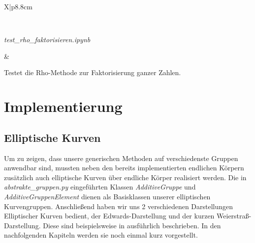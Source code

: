 \documentclass{scrartcl}
\begin{document}
\begin{table}[!ht]
\begin{tabularx}{\linewidth}{X|p{8.8cm}}
\begin{minipage}{\linewidth}
  \end{minipage} \\
  \hline
    \begin{minipage}{\linewidth}
    \emph{test\_rho\_faktorisieren.ipynb}
  \end{minipage} &
  \begin{minipage}{\linewidth}
      \vspace{2pt} Testet die Rho-Methode zur Faktorisierung ganzer Zahlen.   \vspace{2pt}
  \end{minipage}
\end{tabularx}
\renewcommand{\arraystretch}{1}
\caption{Übersicht der Jupyter Notebook Tests unserer Projektarbeit}
\label{tab:tests}
\end{table}


\section{Implementierung}
\label{sec:implementierung}

\subsection{Elliptische Kurven}
\label{sec:elliptische_kurven}

Um zu zeigen, dass unsere generischen Methoden auf verschiedenste Gruppen anwendbar sind, mussten neben den bereits implementierten endlichen Körpern zusätzlich auch elliptische Kurven über endliche Körper realisiert werden. 
Die in \emph{abstrakte\_gruppen.py} eingeführten Klassen \emph{AdditiveGruppe} und \emph{AdditiveGruppenElement} dienen als Basisklassen unserer elliptischen Kurvengruppen.
Anschließend haben wir uns 2 verschiedenen Darstellungen Elliptischer Kurven bedient, der Edwards-Darstellung und der kurzen Weierstraß-Darstellung. Diese sind beispielsweise in \cite{Galbraith2012} ausführlich beschrieben. In den nachfolgenden Kapiteln werden sie noch einmal kurz vorgestellt.
\end{document}
